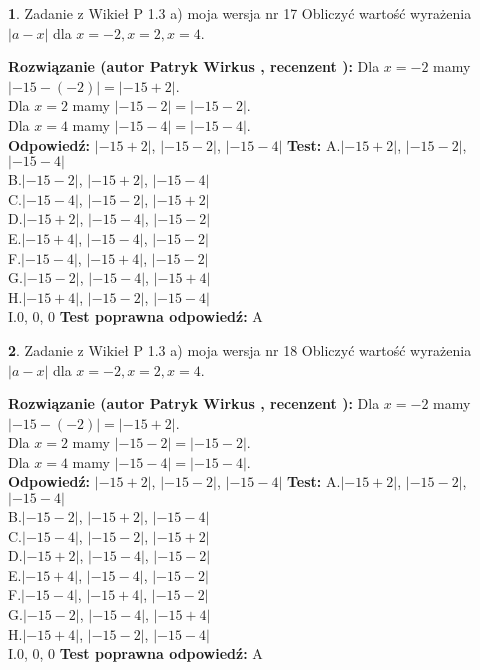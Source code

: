 \documentclass[12pt, a4paper]{article}
\theoremstyle{definition} %
\newtheorem{zad}{}
\newcommand{\zadStart}[1]{\begin{zad}#1\newline}
\newcommand{\zadStop}{\end{zad}}
\newcommand{\rozwStart}[2]{\noindent \textbf{Rozwiązanie (autor #1 , recenzent #2): }\newline}
\newcommand{\rozwStop}{\newline}
\newcommand{\odpStart}{\noindent \textbf{Odpowiedź:}\newline}
\newcommand{\odpStop}{\newline}
\newcommand{\testStart}{\noindent \textbf{Test:}\newline}
\newcommand{\testStop}{\newline}
\newcommand{\kluczStart}{\noindent \textbf{Test poprawna odpowiedź:}\newline}
\newcommand{\kluczStop}{\newline}
\begin{document}
\zadStart{Zadanie z Wikieł P 1.3 a) moja wersja nr 17}
Obliczyć wartość wyrażenia $|a - x|$ dla $x=-2,x=2,x=4$.
\zadStop
\rozwStart{Patryk Wirkus}{}
Dla $x = -2$ mamy $|-15 - (-2)| = |-15 + 2|$.\\
Dla $x = 2$ mamy $|-15 - 2| = |-15 - 2|$.\\
Dla $x = 4$ mamy $|-15 - 4| = |-15 - 4|$.\\
\rozwStop
\odpStart
$|-15 + 2|$, $|-15 - 2|$, $|-15 - 4|$
\odpStop
\testStart
A.$|-15 + 2|$, $|-15 - 2|$, $|-15 - 4|$\\
B.$|-15 - 2|$, $|-15 + 2|$, $|-15 - 4|$\\
C.$|-15 - 4|$, $|-15 - 2|$, $|-15 + 2|$\\
D.$|-15 + 2|$, $|-15 - 4|$, $|-15 - 2|$\\
E.$|-15 + 4|$, $|-15 - 4|$, $|-15 - 2|$\\
F.$|-15 - 4|$, $|-15 + 4|$, $|-15 - 2|$\\
G.$|-15 - 2|$, $|-15 - 4|$, $|-15 + 4|$\\
H.$|-15 + 4|$, $|-15 - 2|$, $|-15 - 4|$\\
I.$0$, $0$, $0$
\testStop
\kluczStart
A
\kluczStop



\zadStart{Zadanie z Wikieł P 1.3 a) moja wersja nr 18}
Obliczyć wartość wyrażenia $|a - x|$ dla $x=-2,x=2,x=4$.
\zadStop
\rozwStart{Patryk Wirkus}{}
Dla $x = -2$ mamy $|-15 - (-2)| = |-15 + 2|$.\\
Dla $x = 2$ mamy $|-15 - 2| = |-15 - 2|$.\\
Dla $x = 4$ mamy $|-15 - 4| = |-15 - 4|$.\\
\rozwStop
\odpStart
$|-15 + 2|$, $|-15 - 2|$, $|-15 - 4|$
\odpStop
\testStart
A.$|-15 + 2|$, $|-15 - 2|$, $|-15 - 4|$\\
B.$|-15 - 2|$, $|-15 + 2|$, $|-15 - 4|$\\
C.$|-15 - 4|$, $|-15 - 2|$, $|-15 + 2|$\\
D.$|-15 + 2|$, $|-15 - 4|$, $|-15 - 2|$\\
E.$|-15 + 4|$, $|-15 - 4|$, $|-15 - 2|$\\
F.$|-15 - 4|$, $|-15 + 4|$, $|-15 - 2|$\\
G.$|-15 - 2|$, $|-15 - 4|$, $|-15 + 4|$\\
H.$|-15 + 4|$, $|-15 - 2|$, $|-15 - 4|$\\
I.$0$, $0$, $0$
\testStop
\kluczStart
A
\kluczStop
\end{document}
